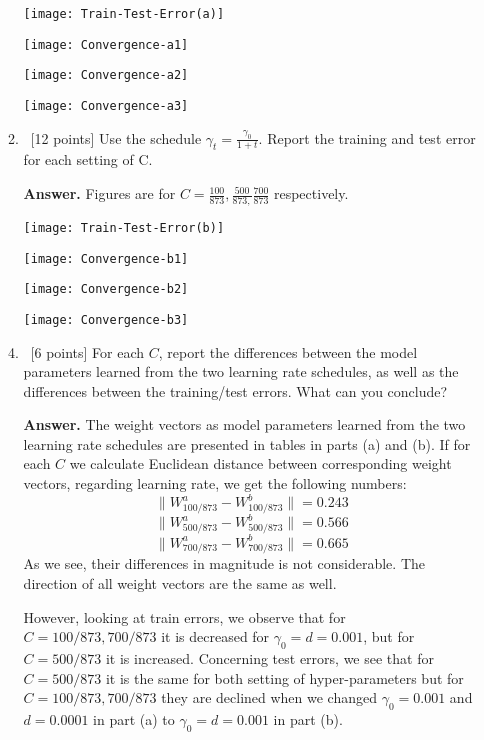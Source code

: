 \documentclass[12pt, fullpage,letterpaper]{article}
\begin{document}
\begin{enumerate}
\begin{enumerate}
\texttt{[image: Train-Test-Error(a)]} 

\texttt{[image: Convergence-a1]} 

\texttt{[image: Convergence-a2]} 

\texttt{[image: Convergence-a3]} 
		
		\item~[12 points] Use the schedule $\gamma_t = \frac{\gamma_0}{1+t}$. Report the training and test error for each setting of C. 
		
\item[{\bf Answer.}] Figures are for $C=  \frac{100}{873}, \frac{500}{873,} \frac{700}{873}$ respectively. 
		
\texttt{[image: Train-Test-Error(b)]} 

\texttt{[image: Convergence-b1]} 

\texttt{[image: Convergence-b2]} 

\texttt{[image: Convergence-b3]} 
		
		\item~[6 points] For each $C$, report the differences between the model parameters learned from the two learning rate schedules, as well as the differences between the training/test errors. What can you conclude? 

\item[{\bf Answer.}] The weight vectors as model parameters learned from the two learning rate schedules are presented in tables in parts (a) and (b). If for each $C$ we calculate Euclidean distance between corresponding weight vectors, regarding learning rate, we get the following numbers:
$$\|W_{100/873}^a - W_{100/873}^b \| = 0.243$$
$$\|W_{500/873}^a - W_{500/873}^b \| = 0.566$$
$$\|W_{700/873}^a - W_{700/873}^b \| = 0.665$$
As we see, their differences in magnitude is not considerable. The direction of all weight vectors are the same as well. 

However, looking at train errors, we observe that for $C= 100/873, 700/873$ it is decreased for $\gamma_0 = d = 0.001$, but for $C = 500/873$ it is increased. Concerning test errors, we see that for $C= 500/873$ it is the same for both setting of hyper-parameters but for $C = 100/873, 700/873$ they are declined when we changed $\gamma_0 = 0.001$ and $d = 0.0001$ in part (a) to $\gamma_0 = d = 0.001$ in part (b).

	\end{enumerate}



\end{enumerate}
\end{document}
